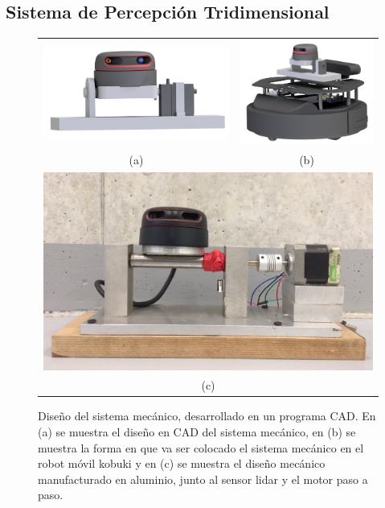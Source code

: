 \subsection{Sistema de Percepción Tridimensional}
\label{sec:SistP3D}
\begin{figure}%
  \centering
  \begin{tabular}{cc}
     \includegraphics[width=0.45\linewidth]{images/lidar_3d.png}&
     \includegraphics[width=0.45\linewidth]{images/lidar_wKbki.png}\\
    (a) & (b)\\
    \multicolumn{2}{c}{\includegraphics[width=0.70\linewidth]{images/LIDAR_SIST.JPG}}\\
    \multicolumn{2}{c}{(c)}
  \end{tabular}
  \captionsetup{font=footnotesize}
    \caption{\label{f:lidar3D}Diseño del sistema mecánico, desarrollado en un programa CAD. En (a) se 
    muestra el diseño en CAD del sistema mecánico, en (b) se muestra la forma en que va ser colocado 
    el sistema mecánico en el robot móvil kobuki y en (c) se muestra el diseño mecánico manufacturado 
    en aluminio, junto al sensor lidar y el motor paso a paso.}
\end{figure}
